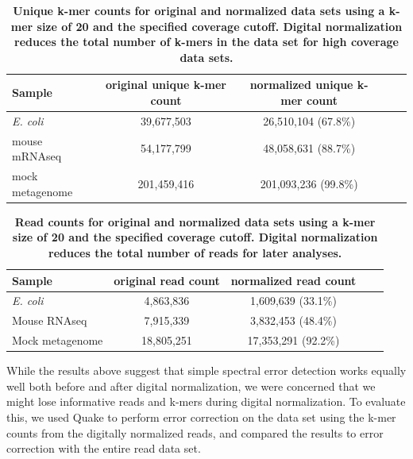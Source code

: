 \documentclass{article}
\begin{document}

\begin{table}
\centering
\begin{tabular}{|l|c|c|c|c|}
\hline
Sample              & original unique k-mer count & normalized unique k-mer  count \\
\hline
{\em E. coli}       & 39,677,503 & 26,510,104 (67.8\%) \\
mouse mRNAseq       & 54,177,799 & 48,058,631 (88.7\%) \\
mock metagenome     & 201,459,416  & 201,093,236 (99.8\%) \\
\hline
\end{tabular}

\caption{{\bf Unique k-mer counts for original and normalized data
    sets using a k-mer size of 20 and the specified coverage cutoff.
    Digital normalization reduces the total number of k-mers in the
    data set for high coverage data sets.}}

\label{tab:kmer_counts}
\end{table}



\begin{table}
\centering
\begin{tabular}{|l|c|c|c|c|}
\hline
Sample              & original read count    &  normalized read count \\
\hline
{\em E. coli}       & 4,863,836   & 1,609,639 (33.1\%) \\
Mouse RNAseq        & 7,915,339   & 3,832,453 (48.4\%) \\
Mock metagenome     & 18,805,251  & 17,353,291 (92.2\%) \\

\hline
\end{tabular}

\caption{{\bf Read counts for original and normalized data sets using
    a k-mer size of 20 and the specified coverage cutoff. Digital
    normalization reduces the total number of reads for later analyses.}}
\label{tab:read_counts}
\end{table}

While the results above suggest that simple spectral error detection
works equally well both before and after digital normalization, we
were concerned that we might lose informative reads and k-mers during
digital normalization.  To evaluate this, we used Quake \cite{quake}
to perform error correction on the data set using the k-mer counts
from the digitally normalized reads, and compared the results to error
correction with the entire read data set.
\end{document}
